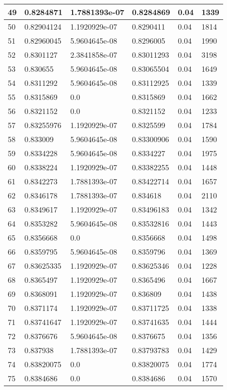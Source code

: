 \begin{longtable}{|l|l|l|l|l|l|}
49 & 0.8284871 & 1.7881393e-07 & 0.8284869 & 0.04 & 1339 \\ \hline 
50 & 0.82904124 & 1.1920929e-07 & 0.8290411 & 0.04 & 1814 \\ \hline 
51 & 0.82960045 & 5.9604645e-08 & 0.8296005 & 0.04 & 1990 \\ \hline 
52 & 0.8301127 & 2.3841858e-07 & 0.83011293 & 0.04 & 3198 \\ \hline 
53 & 0.830655 & 5.9604645e-08 & 0.83065504 & 0.04 & 1649 \\ \hline 
54 & 0.8311292 & 5.9604645e-08 & 0.83112925 & 0.04 & 1339 \\ \hline 
55 & 0.8315869 & 0.0 & 0.8315869 & 0.04 & 1662 \\ \hline 
56 & 0.8321152 & 0.0 & 0.8321152 & 0.04 & 1233 \\ \hline 
57 & 0.83255976 & 1.1920929e-07 & 0.8325599 & 0.04 & 1784 \\ \hline 
58 & 0.833009 & 5.9604645e-08 & 0.83300906 & 0.04 & 1590 \\ \hline 
59 & 0.8334228 & 5.9604645e-08 & 0.8334227 & 0.04 & 1975 \\ \hline 
60 & 0.8338224 & 1.1920929e-07 & 0.83382255 & 0.04 & 1448 \\ \hline 
61 & 0.8342273 & 1.7881393e-07 & 0.83422714 & 0.04 & 1657 \\ \hline 
62 & 0.8346178 & 1.7881393e-07 & 0.834618 & 0.04 & 2110 \\ \hline 
63 & 0.8349617 & 1.1920929e-07 & 0.83496183 & 0.04 & 1342 \\ \hline 
64 & 0.8353282 & 5.9604645e-08 & 0.83532816 & 0.04 & 1443 \\ \hline 
65 & 0.8356668 & 0.0 & 0.8356668 & 0.04 & 1498 \\ \hline 
66 & 0.8359795 & 5.9604645e-08 & 0.8359796 & 0.04 & 1369 \\ \hline 
67 & 0.83625335 & 1.1920929e-07 & 0.83625346 & 0.04 & 1228 \\ \hline 
68 & 0.8365497 & 1.1920929e-07 & 0.8365496 & 0.04 & 1667 \\ \hline 
69 & 0.8368091 & 1.1920929e-07 & 0.836809 & 0.04 & 1438 \\ \hline 
70 & 0.8371174 & 1.1920929e-07 & 0.83711725 & 0.04 & 1338 \\ \hline 
71 & 0.83741647 & 1.1920929e-07 & 0.83741635 & 0.04 & 1444 \\ \hline 
72 & 0.8376676 & 5.9604645e-08 & 0.8376675 & 0.04 & 1356 \\ \hline 
73 & 0.837938 & 1.7881393e-07 & 0.83793783 & 0.04 & 1429 \\ \hline 
74 & 0.83820075 & 0.0 & 0.83820075 & 0.04 & 1774 \\ \hline 
75 & 0.8384686 & 0.0 & 0.8384686 & 0.04 & 1570 \\ \hline 
\end{longtable}
